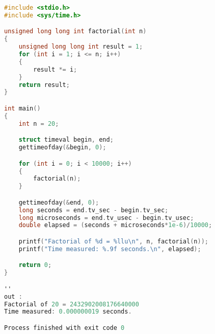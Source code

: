 \begin{lstlisting}[language=C,label={lst:c-factorielle-10000},title={Programme de test en C},
    escapeinside={''}]
#include <stdio.h>
#include <sys/time.h>

unsigned long long int factorial(int n)
{
    unsigned long long int result = 1;
    for (int i = 1; i <= n; i++)
    {
        result *= i;
    }
    return result;
}

int main()
{
    int n = 20;

    struct timeval begin, end;
    gettimeofday(&begin, 0);

    for (int i = 0; i < 10000; i++)
    {
        factorial(n);
    }

    gettimeofday(&end, 0);
    long seconds = end.tv_sec - begin.tv_sec;
    long microseconds = end.tv_usec - begin.tv_usec;
    double elapsed = (seconds + microseconds*1e-6)/10000;

    printf("Factorial of %d = %llu\n", n, factorial(n));
    printf("Time measured: %.9f seconds.\n", elapsed);

    return 0;
}

''
out :
Factorial of 20 = 2432902008176640000
Time measured: 0.000000019 seconds.

Process finished with exit code 0
\end{lstlisting}